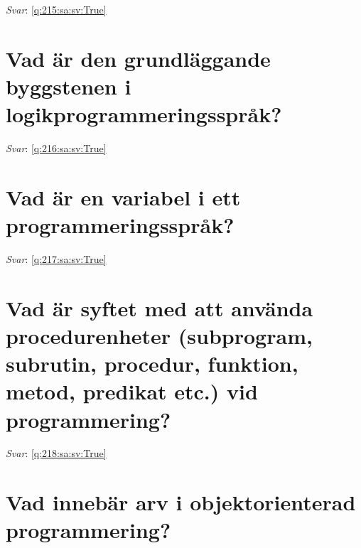 \documentclass[a4paper,11pt,oneside]{book}
\begin{document}
\begin{sloppypar}
\vspace{1cm}

\textit{Svar}: \autoref{q:215:sa:sv:True}



\section{Vad \"ar den grundl\"aggande byggstenen i logikprogrammeringsspr\r{a}k?}

\label{q:216:sa:sv:False}

\vspace{2cm}

\noindent\makebox[\textwidth]{\hrulefill}

\vspace{1cm}

\textit{Svar}: \autoref{q:216:sa:sv:True}



\section{Vad \"ar en variabel i ett programmeringsspr\r{a}k?}

\label{q:217:sa:sv:False}

\vspace{2cm}

\noindent\makebox[\textwidth]{\hrulefill}

\vspace{1cm}

\textit{Svar}: \autoref{q:217:sa:sv:True}



\section{Vad \"ar syftet med att anv\"anda procedurenheter (subprogram, subrutin, procedur, funktion, metod, predikat etc.) vid programmering?}

\label{q:218:sa:sv:False}

\vspace{2cm}

\noindent\makebox[\textwidth]{\hrulefill}

\vspace{1cm}

\textit{Svar}: \autoref{q:218:sa:sv:True}



\section{Vad inneb\"ar arv i objektorienterad programmering?}


\end{sloppypar}
\end{document}
